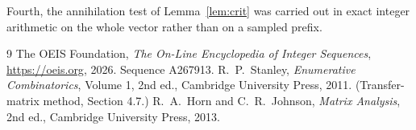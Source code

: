 \documentclass[11pt,a4paper]{article}
\theoremstyle{plain}
\theoremstyle{definition}
\begin{document}
Fourth, the annihilation test of Lemma~\ref{lem:crit} was carried out in exact integer
arithmetic on the whole vector rather than on a sampled prefix.

\begin{thebibliography}{9}
 The OEIS Foundation, \emph{The On-Line Encyclopedia of Integer
Sequences}, \url{https://oeis.org}, 2026. Sequence A267913.
 R.~P.~Stanley, \emph{Enumerative Combinatorics}, Volume 1, 2nd ed.,
Cambridge University Press, 2011. (Transfer-matrix method, Section 4.7.)
 R.~A.~Horn and C.~R.~Johnson, \emph{Matrix Analysis}, 2nd ed., Cambridge
University Press, 2013.
\end{thebibliography}
\end{document}
